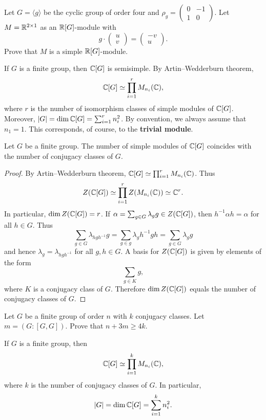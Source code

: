 \begin{exercise}
Let $G=\langle g\rangle$ be the cyclic group 
of order four and $\rho_g=\begin{pmatrix}
0&-1\\
1&0\end{pmatrix}$. 
Let $M=\mathbb{R}^{2\times 1}$ as an $\mathbb{R}[G]$-module with 
\[
g\cdot\begin{pmatrix}u\\v\end{pmatrix}
=\begin{pmatrix}-v\\u\end{pmatrix}.
\]
Prove that $M$ is a simple $\mathbb{R}[G]$-module. 
\end{exercise}

If $G$ is a finite group, 
then $\mathbb{C}[G]$ is semisimple. By Artin--Wedderburn theorem, 
\[
\mathbb{C}[G]\simeq\prod_{i=1}^r M_{n_i}(\mathbb{C}),
\]
where $r$ is the number of isomorphism classes of simple modules of $\mathbb{C}[G]$. Moreover, 
$|G|=\dim\mathbb{C}[G]=\sum_{i=1}^r n_i^2$. By convention, 
we always assume that $n_1=1$. 
This corresponds, of course, to the \textbf{trivial module}. 

\begin{theorem}
    Let $G$ be a finite group. The number of simple 
    modules of $\mathbb{C}[G]$ coincides with the number of conjugacy classes of $G$. 
\end{theorem}

\begin{proof}
    By Artin--Wedderburn theorem, $\mathbb{C}[G]\simeq\prod_{i=1}^rM_{n_i}(\mathbb{C})$. Thus 
    \[
		Z(\mathbb{C}[G])\simeq\prod_{i=1}^rZ(M_{n_i}(\mathbb{C}))\simeq\mathbb{C}^r.
	\]
	In particular, $\dim Z(\mathbb{C}[G])=r$. If $\alpha=\sum_{g\in
	G}\lambda_gg\in Z(\mathbb{C}[G])$, then $h^{-1}\alpha h=\alpha$ for all $h\in
	G$. Thus 
	\[
		\sum_{g\in G}\lambda_{hgh^{-1}}g=
		\sum_{g\in g}\lambda_g h^{-1}gh=\sum_{g\in G}\lambda_gg
	\]
	and hence $\lambda_{g}=\lambda_{hgh^{-1}}$ for all $g,h\in G$. A basis for 
	$Z(\mathbb{C}[G])$ is given by elements of the form 
	\[
		\sum_{g\in K}g,
	\]
	where $K$ is a conjugacy class of $G$. Therefore $\dim Z(\mathbb{C}[G])$ equals 
	the number of conjugacy classes of $G$.
\end{proof}

\begin{exercise}
    Let $G$ be a finite group of order $n$ with $k$ conjugacy classes.
    Let $m=(G:[G,G])$. Prove that $n+3m\geq4k$. 
\end{exercise}

If $G$ is a finite group,
then 
\[
\mathbb{C}[G]\simeq \prod_{i=1}^k M_{n_i}(\mathbb{C}),
\]
where $k$ is the number of conjugacy classes of $G$. 
In particular, 
\[
|G|=\dim\mathbb{C}[G]=\sum_{i=1}^k n_i^2.
\]

